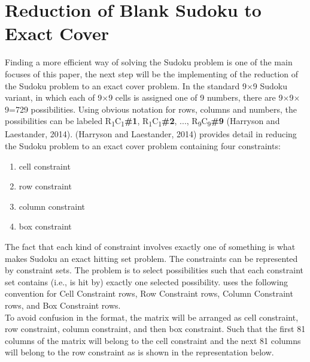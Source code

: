 \documentclass[a4paper,oneside,11pt]{report}
\newcounter{row}
\newcounter{col}
\begin{document}
\section{Reduction of Blank Sudoku to Exact Cover}
Finding a more efficient way of solving the Sudoku problem is one of the main focuses of this paper, the next step will be the implementing of the reduction of the Sudoku problem to an exact cover problem. In the standard 9$\times$9 Sudoku variant, in which each of 9$\times$9 cells is assigned one of 9 numbers, there are 9$\times$9$\times$9=729 possibilities. Using obvious notation for rows, columns and numbers, the possibilities can be labeled R\textsubscript{1}C\textsubscript{1}\textbf{\#1}, R\textsubscript{1}C\textsubscript{1}\textbf{\#2}, ..., R\textsubscript{9}C\textsubscript{9}\textbf{\#9} (Harryson and Laestander, 2014). (Harryson and Laestander, 2014) provides detail in reducing the Sudoku problem to an exact cover problem containing four constraints:
\begin{enumerate}[label=\alph*.]
\item cell constraint
\vspace{-0.5cm}
\item row constraint
\vspace{-0.5cm}
\item column constraint
\vspace{-0.5cm}
\item box constraint
\end{enumerate}
The fact that each kind of constraint involves exactly one of something is what makes Sudoku an exact hitting set problem. The constraints can be represented by constraint sets. The problem is to select possibilities such that each constraint set contains (i.e., is hit by) exactly one selected possibility. \cite{Harrysson} uses the following convention for Cell Constraint rows, Row Constraint rows, Column Constraint rows, and Box Constraint rows.\\

\noindent To avoid confusion in the format, the matrix will be arranged as cell constraint, row constraint, column constraint, and then box constraint. Such that the first 81 columns of the matrix will belong to the cell constraint and the next 81 columns will belong to the row constraint as is shown in the representation below.\\
\end{document}
